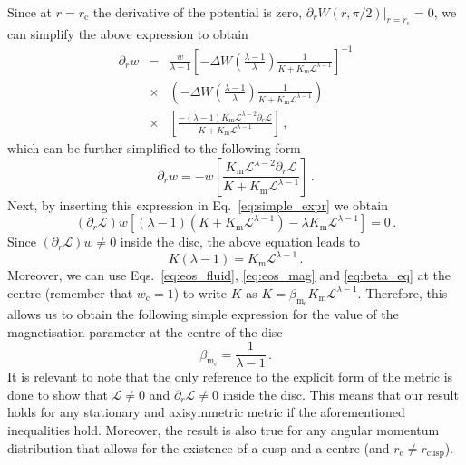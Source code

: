 \documentclass[referee]{aa}
\begin{document}
\begin{appendix}
\begin{eqnarray}
\end{eqnarray}
Since at $r = r_{\mathrm{c}}$ the derivative of the potential is zero, $\partial_r W(r, \pi/2)|_{r = r_{\mathrm{c}}} = 0$, we can simplify the above expression to obtain
\begin{eqnarray}
\partial_r w &=& \frac{w}{\lambda - 1} \left[-\Delta W \left(\frac{\lambda -1}{\lambda}\right)\frac{1}{K+K_{\mathrm{m}}\mathcal{L}^{\lambda - 1}}\right]^{-1} 
\nonumber \\
&\times&
\left(-\Delta W \left(\frac{\lambda -1}{\lambda}\right)\frac{1}{K+K_{\mathrm{m}}\mathcal{L}^{\lambda - 1}}\right)
\nonumber \\
&\times&\left[\frac{-(\lambda - 1) K_{\mathrm{m}} \mathcal{L}^{\lambda - 2} \partial_r \mathcal{L}}{K+K_{\mathrm{m}}\mathcal{L}^{\lambda - 1}}\right]\,,
\end{eqnarray}
which can be further simplified to the following form
\begin{equation}
\partial_r w = - w \left[\frac{K_{\mathrm{m}} \mathcal{L}^{\lambda - 2} \partial_r \mathcal{L}}{K+K_{\mathrm{m}}\mathcal{L}^{\lambda - 1}}\right]\,.
\end{equation}
Next, by inserting this expression in Eq.~\eqref{eq:simple_expr} we obtain
\begin{equation}
(\partial_r \mathcal{L}) w [(\lambda -1)(K+K_{\mathrm{m}}\mathcal{L}^{\lambda - 1}) - \lambda K_{\mathrm{m}}\mathcal{L}^{\lambda - 1}] = 0\,.
\end{equation}
Since $(\partial_r \mathcal{L}) w \neq 0$ inside the disc, the above equation leads to 
\begin{equation}
K (\lambda - 1) = K_{\mathrm{m}}\mathcal{L}^{\lambda - 1}\,.
\end{equation}
Moreover, we can use Eqs.~\eqref{eq:eos_fluid}, \eqref{eq:eos_mag} and \eqref{eq:beta_eq} at the centre (remember that $w_{\mathrm{c}} = 1$) to write $K$ as $K = \beta_{\mathrm{m}_{\mathrm{c}}} K_\mathrm{m}\mathcal{L}^{\lambda -1}$. Therefore, this allows us to obtain the following simple expression for the value of the magnetisation parameter at the centre of the disc
\begin{equation}
\beta_{\mathrm{m}_{\mathrm{c}}} = \frac{1}{\lambda - 1}\,.
\end{equation}
It is relevant to note that the only reference to the explicit form of the metric is done to show that $\mathcal{L} \neq 0$ and $\partial_r \mathcal{L} \neq 0$ inside the disc. This means that our result holds for any stationary and axisymmetric metric if the aforementioned inequalities hold. Moreover, the result is also true for any angular momentum distribution that allows for the existence of a cusp and a centre (and $r_{\mathrm{c}} \neq r_{\mathrm{cusp}}$).

\end{appendix}
\end{document}
